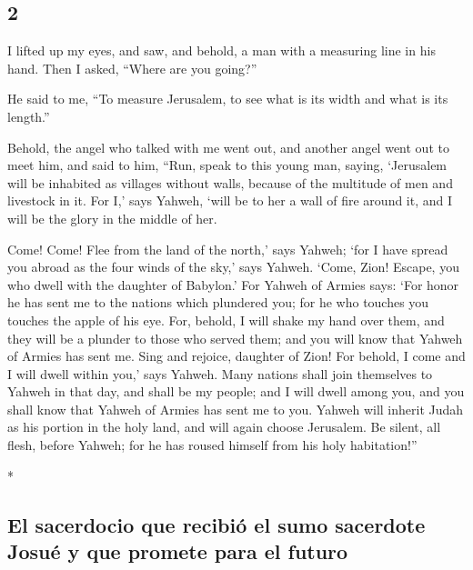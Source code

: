 \begin{paracol}{2}
\switchcolumn
\begin{otherlanguage}{english}

\hypertarget{section-3}{%
\section{2}\label{section-3}}

 I lifted up my eyes, and saw, and behold, a man with a
measuring line in his hand.  Then I asked, ``Where are you
going?''

He said to me, ``To measure Jerusalem, to see what is its width and what
is its length.''

 Behold, the angel who talked with me went out, and
another angel went out to meet him,  and said to him,
``Run, speak to this young man, saying, `Jerusalem will be inhabited as
villages without walls, because of the multitude of men and livestock in
it.  For I,' says Yahweh, `will be to her a wall of fire
around it, and I will be the glory in the middle of her.

 Come! Come! Flee from the land of the north,' says
Yahweh; `for I have spread you abroad as the four winds of the sky,'
says Yahweh.  `Come, Zion! Escape, you who dwell with the
daughter of Babylon.'  For Yahweh of Armies says: `For
honor he has sent me to the nations which plundered you; for he who
touches you touches the apple of his eye.  For, behold, I
will shake my hand over them, and they will be a plunder to those who
served them; and you will know that Yahweh of Armies has sent me.
 Sing and rejoice, daughter of Zion! For behold, I come
and I will dwell within you,' says Yahweh.  Many nations
shall join themselves to Yahweh in that day, and shall be my people; and
I will dwell among you, and you shall know that Yahweh of Armies has
sent me to you.  Yahweh will inherit Judah as his portion
in the holy land, and will again choose Jerusalem.  Be
silent, all flesh, before Yahweh; for he has roused himself from his
holy habitation!''

\end{otherlanguage}

\switchcolumn[0]*

\hypertarget{el-sacerdocio-que-recibiuxf3-el-sumo-sacerdote-josuuxe9-y-que-promete-para-el-futuro}{%
\subsection{El sacerdocio que recibió el sumo sacerdote Josué y que
promete para el
futuro}\label{el-sacerdocio-que-recibiuxf3-el-sumo-sacerdote-josuuxe9-y-que-promete-para-el-futuro}}


\end{paracol}

